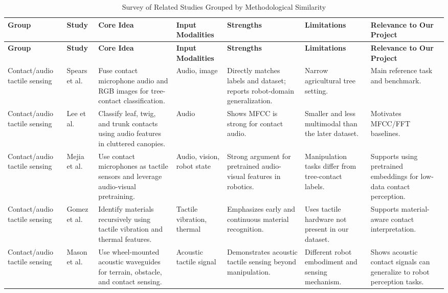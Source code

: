 \documentclass[12pt,a4paper]{article}
\begin{document}
\begin{landscape}
\small
\setlength{\tabcolsep}{3pt}
\renewcommand{\arraystretch}{1.15}
\begin{longtable}{P{2.3cm}P{3.6cm}P{4.0cm}P{2.5cm}P{3.4cm}P{3.4cm}P{4.2cm}}
\caption{Survey of Related Studies Grouped by Methodological Similarity}
\label{tab:survey}\\
\toprule
\textbf{Group} & \textbf{Study} & \textbf{Core Idea} & \textbf{Input Modalities} & \textbf{Strengths} & \textbf{Limitations} & \textbf{Relevance to Our Project} \\
\midrule
\endfirsthead
\toprule
\textbf{Group} & \textbf{Study} & \textbf{Core Idea} & \textbf{Input Modalities} & \textbf{Strengths} & \textbf{Limitations} & \textbf{Relevance to Our Project} \\
\midrule
\endhead
\bottomrule
\endfoot
Contact/audio tactile sensing & Spears et al.~\cite{spears2025tree} & Fuse contact microphone audio and RGB images for tree-contact classification. & Audio, image & Directly matches labels and dataset; reports robot-domain generalization. & Narrow agricultural tree setting. & Main reference task and benchmark. \\
Contact/audio tactile sensing & Lee et al.~\cite{lee2022contact} & Classify leaf, twig, and trunk contacts using audio features in cluttered canopies. & Audio & Shows MFCC is strong for contact audio. & Smaller and less multimodal than the later dataset. & Motivates MFCC/FFT baselines. \\
Contact/audio tactile sensing & Mejia et al.~\cite{mejia2024hearing} & Use contact microphones as tactile sensors and leverage audio-visual pretraining. & Audio, vision, robot state & Strong argument for pretrained audio-visual features in robotics. & Manipulation tasks differ from tree-contact labels. & Supports using pretrained embeddings for low-data contact perception. \\
Contact/audio tactile sensing & Gomez et al.~\cite{gomez2018material} & Identify materials recursively using tactile vibration and thermal features. & Tactile vibration, thermal & Emphasizes early and continuous material recognition. & Uses tactile hardware not present in our dataset. & Supports material-aware contact interpretation. \\
Contact/audio tactile sensing & Mason et al.~\cite{mason2024wheel} & Use wheel-mounted acoustic waveguides for terrain, obstacle, and contact sensing. & Acoustic tactile signal & Demonstrates acoustic tactile sensing beyond manipulation. & Different robot embodiment and sensing mechanism. & Shows acoustic contact signals can generalize to robot perception tasks. \\

\end{longtable}
\end{landscape}
\end{document}
